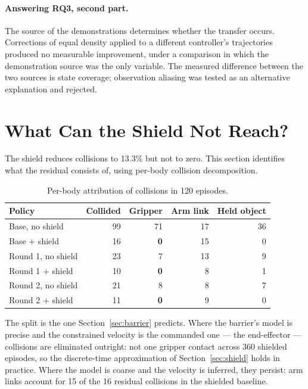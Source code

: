 \documentclass[a4paper,11pt]{report}
\begin{document}
\paragraph{Answering RQ3, second part.}
The source of the demonstrations determines whether the transfer occurs. Corrections of equal
density applied to a different controller's trajectories produced no measurable improvement, under
a comparison in which the demonstration source was the only variable. The measured difference
between the two sources is state coverage; observation aliasing was tested as an alternative
explanation and rejected.

\section{What Can the Shield Not Reach?}\label{sec:res:scope}

The shield reduces collisions to 13.3\% but not to zero. This section identifies what the residual
consists of, using per-body collision decomposition. 

\begin{table}[htbp]
\centering
\begin{threeparttable}
\caption[Residual collisions by culprit body]{%
  Per-body attribution of collisions in 120 episodes.}
\label{tab:culprits}
\begin{tabular}{lrrrr}
\toprule
\textbf{Policy} & \textbf{Collided} & \textbf{Gripper} & \textbf{Arm link}
  & \textbf{Held object} \\
\midrule
Base, no shield        & 99 & 71          & 17 & 36 \\
Base + shield          & 16 & \textbf{0}  & 15 & \phantom{0}0 \\
\addlinespace[2pt]
Round 1, no shield     & 23 & \phantom{0}7 & 13 & \phantom{0}9 \\
Round 1 + shield       & 10 & \textbf{0}  & \phantom{0}8 & \phantom{0}1 \\
\addlinespace[2pt]
Round 2, no shield     & 21 & \phantom{0}8 & \phantom{0}8 & \phantom{0}7 \\
Round 2 + shield       & 11 & \textbf{0}  & \phantom{0}9 & \phantom{0}0 \\
\bottomrule
\end{tabular}
\end{threeparttable}
\end{table}

The split is the one Section~\ref{sec:barrier} predicts. Where the barrier's model is precise and
the constrained velocity is the commanded one --- the end-effector --- collisions are eliminated
outright: not one gripper contact across 360 shielded episodes, so the discrete-time
approximation of Section~\ref{sec:shield} holds in practice. Where the model is coarse and the
velocity is inferred, they persist: arm links account for 15 of the 16 residual collisions in the
shielded baseline.
\end{document}
